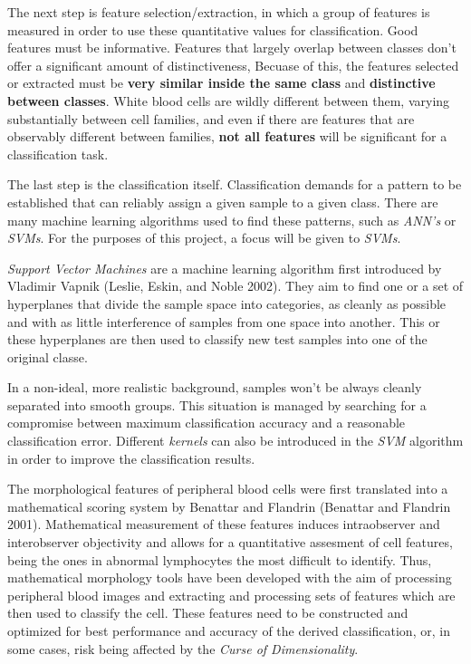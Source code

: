 \documentclass[]{article}
\begin{document}
The next step is feature selection/extraction, in which a group of
features is measured in order to use these quantitative values for
classification. Good features must be informative. Features that largely
overlap between classes don't offer a significant amount of
distinctiveness, Becuase of this, the features selected or extracted
must be \textbf{very similar inside the same class} and
\textbf{distinctive between classes}. White blood cells are wildly
different between them, varying substantially between cell families, and
even if there are features that are observably different between
families, \textbf{not all features} will be significant for a
classification task.

The last step is the classification itself. Classification demands for a
pattern to be established that can reliably assign a given sample to a
given class. There are many machine learning algorithms used to find
these patterns, such as \emph{ANN's} or \emph{SVMs}. For the purposes of
this project, a focus will be given to \emph{SVMs}.

\emph{Support Vector Machines} are a machine learning algorithm first
introduced by Vladimir Vapnik (Leslie, Eskin, and Noble 2002). They aim
to find one or a set of hyperplanes that divide the sample space into
categories, as cleanly as possible and with as little interference of
samples from one space into another. This or these hyperplanes are then
used to classify new test samples into one of the original classe.

In a non-ideal, more realistic background, samples won't be always
cleanly separated into smooth groups. This situation is managed by
searching for a compromise between maximum classification accuracy and a
reasonable classification error. Different \emph{kernels} can also be
introduced in the \emph{SVM} algorithm in order to improve the
classification results.

The morphological features of peripheral blood cells were first
translated into a mathematical scoring system by Benattar and Flandrin
(Benattar and Flandrin 2001). Mathematical measurement of these features
induces intraobserver and interobserver objectivity and allows for a
quantitative assesment of cell features, being the ones in abnormal
lymphocytes the most difficult to identify. Thus, mathematical
morphology tools have been developed with the aim of processing
peripheral blood images and extracting and processing sets of features
which are then used to classify the cell. These features need to be
constructed and optimized for best performance and accuracy of the
derived classification, or, in some cases, risk being affected by the
\emph{Curse of Dimensionality}.
\end{document}
